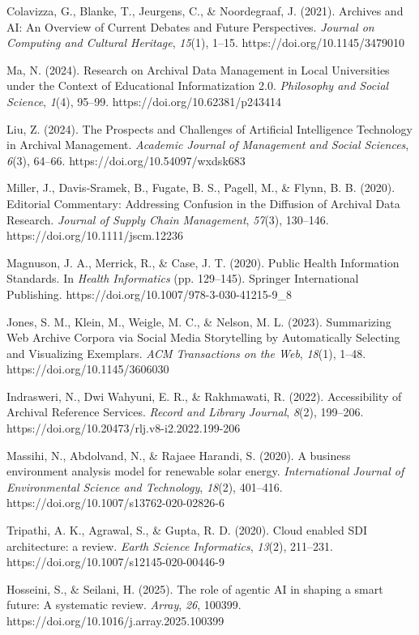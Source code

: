 Colavizza, G., Blanke, T., Jeurgens, C., \& Noordegraaf, J. (2021).
Archives and AI: An Overview of Current Debates and Future Perspectives.
\emph{Journal on Computing and Cultural Heritage}, \emph{15}(1), 1--15.
https://doi.org/10.1145/3479010

Ma, N. (2024). Research on Archival Data Management in Local
Universities under the Context of Educational Informatization 2.0.
\emph{Philosophy and Social Science}, \emph{1}(4), 95--99.
https://doi.org/10.62381/p243414

Liu, Z. (2024). The Prospects and Challenges of Artificial Intelligence
Technology in Archival Management. \emph{Academic Journal of Management
and Social Sciences}, \emph{6}(3), 64--66.
https://doi.org/10.54097/wxdsk683

Miller, J., Davis‐Sramek, B., Fugate, B. S., Pagell, M., \& Flynn, B. B.
(2020). Editorial Commentary: Addressing Confusion in the Diffusion of
Archival Data Research. \emph{Journal of Supply Chain Management},
\emph{57}(3), 130--146. https://doi.org/10.1111/jscm.12236

Magnuson, J. A., Merrick, R., \& Case, J. T. (2020). Public Health
Information Standards. In \emph{Health Informatics} (pp. 129--145).
Springer International Publishing.
https://doi.org/10.1007/978-3-030-41215-9\_8

Jones, S. M., Klein, M., Weigle, M. C., \& Nelson, M. L. (2023).
Summarizing Web Archive Corpora via Social Media Storytelling by
Automatically Selecting and Visualizing Exemplars. \emph{ACM
Transactions on the Web}, \emph{18}(1), 1--48.
https://doi.org/10.1145/3606030

Indrasweri, N., Dwi Wahyuni, E. R., \& Rakhmawati, R. (2022).
Accessibility of Archival Reference Services. \emph{Record and Library
Journal}, \emph{8}(2), 199--206.
https://doi.org/10.20473/rlj.v8-i2.2022.199-206

Massihi, N., Abdolvand, N., \& Rajaee Harandi, S. (2020). A business
environment analysis model for renewable solar energy.
\emph{International Journal of Environmental Science and Technology},
\emph{18}(2), 401--416. https://doi.org/10.1007/s13762-020-02826-6

Tripathi, A. K., Agrawal, S., \& Gupta, R. D. (2020). Cloud enabled SDI
architecture: a review. \emph{Earth Science Informatics}, \emph{13}(2),
211--231. https://doi.org/10.1007/s12145-020-00446-9

Hosseini, S., \& Seilani, H. (2025). The role of agentic AI in shaping a
smart future: A systematic review. \emph{Array}, \emph{26}, 100399.
https://doi.org/10.1016/j.array.2025.100399

